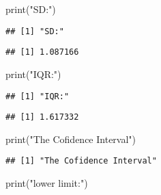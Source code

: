 \documentclass[
]{article}
\newenvironment{Shaded}{\begin{snugshade}}{\end{snugshade}}
\newcommand{\FunctionTok}[1]{\textcolor[rgb]{0.00,0.00,0.00}{#1}}
\newcommand{\NormalTok}[1]{#1}
\newcommand{\SpecialCharTok}[1]{\textcolor[rgb]{0.00,0.00,0.00}{#1}}
\newcommand{\StringTok}[1]{\textcolor[rgb]{0.31,0.60,0.02}{#1}}
\begin{document}
\begin{Shaded}
\begin{Highlighting}[]
\FunctionTok{print}\NormalTok{(}\StringTok{"SD:"}\NormalTok{)}
\end{Highlighting}
\end{Shaded}

\begin{verbatim}
## [1] "SD:"
\end{verbatim}

\begin{Shaded}
\end{Shaded}

\begin{verbatim}
## [1] 1.087166
\end{verbatim}

\begin{Shaded}
\begin{Highlighting}[]
\FunctionTok{print}\NormalTok{(}\StringTok{"IQR:"}\NormalTok{)}
\end{Highlighting}
\end{Shaded}

\begin{verbatim}
## [1] "IQR:"
\end{verbatim}

\begin{Shaded}
\end{Shaded}

\begin{verbatim}
## [1] 1.617332
\end{verbatim}

\begin{Shaded}
\begin{Highlighting}[]
\FunctionTok{print}\NormalTok{(}\StringTok{"The Cofidence Interval"}\NormalTok{)}
\end{Highlighting}
\end{Shaded}

\begin{verbatim}
## [1] "The Cofidence Interval"
\end{verbatim}

\begin{Shaded}
\begin{Highlighting}[]
\FunctionTok{print}\NormalTok{(}\StringTok{"lower limit:"}\NormalTok{)}
\end{Highlighting}
\end{Shaded}
\end{document}
